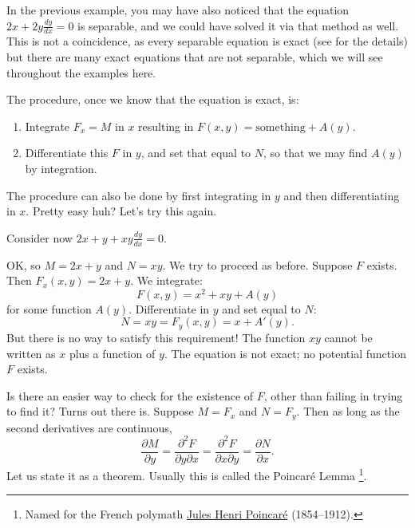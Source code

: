 \documentclass{ximera}
\begin{document}
In the previous example, you may have also noticed that the equation $2x + 2y\frac{dy}{dx} = 0$ is separable, and we could have solved it via that method as well. This is not a coincidence, as every separable equation is exact (see  for the details) but there are many exact equations that are not separable, which we will see throughout the examples here. 

The procedure, once we know that the equation is exact, is:
\begin{enumerate}%
    \item Integrate $F_x = M$ in $x$ resulting in $F(x,y) = \text{something} + A(y)$.
    \item Differentiate this $F$ in $y$, and set that equal to $N$, so that we may find $A(y)$ by integration.
\end{enumerate}
The procedure can also be done by first integrating in $y$ and then differentiating in $x$. Pretty easy huh?  Let's try this again.

\begin{example}
    Consider now $2x+y + xy \frac{dy}{dx} = 0$.
\end{example}

\begin{exampleSol}
    OK\@, so $M = 2x+y$ and $N=xy$.  We try to proceed as before. Suppose  $F$ exists.  Then $F_x (x,y) = 2x+y$. We integrate:
    \begin{equation*}
        F(x,y) = x^2 + xy + A(y)
    \end{equation*}
    for some function $A(y)$.  Differentiate in $y$ and set equal to $N$:
    \begin{equation*}
        N = xy = F_y (x,y) = x+A'(y) .
    \end{equation*}
    But there is no way to satisfy this requirement!  The function $xy$ cannot be written as $x$ plus a function of $y$.  The equation is not exact; no potential function $F$ exists.
\end{exampleSol}

Is there an easier way to check for the existence of $F$, other than failing in trying to find it?  Turns out there is.  Suppose $M = F_x$ and $N = F_y$.  Then as long as the second derivatives are continuous,
\begin{equation*}
    \frac{\partial M}{\partial y} = \frac{\partial^2 F}{\partial y \partial x} = \frac{\partial^2 F}{\partial x \partial y} = \frac{\partial N}{\partial x} .
\end{equation*}
Let us state it as a theorem.  Usually this is called the Poincar\'e Lemma%
\footnote{Named for the French polymath \href{https://en.wikipedia.org/wiki/Henri_Poincar\%C3\%A9}{Jules Henri
Poincar\'e} (1854--1912).}.
\end{document}
